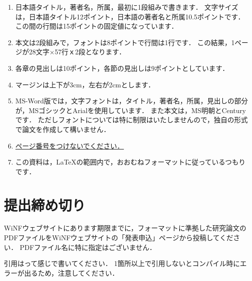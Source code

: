 \documentclass[a4j,8pt,twocolumn]{extarticle}
\begin{document}
\begin{enumerate}
\item 日本語タイトル，著者名，所属，最初に1段組みで書きます．
文字サイズは，日本語タイトル12ポイント，日本語の著者名と所属10.5ポイントです．
この間の行間は15ポイントの固定値になっています．

\item 本文は2段組みで，フォントは8ポイントで行間は1行です．
この結果，1ページが28文字×57行ｘ2段となります．

\item 各章の見出しは10ポイント，各節の見出しは9ポイントとしています．

\item マージンは上下が3cm，左右が2cmとします．

\item MS-Word版では，文字フォントは，タイトル，著者名，所属，見出しの部分が，MSゴシックとArialを使用しています．
また本文は，MS明朝とCenturyです．
ただしフォントについては特に制限はいたしませんので，独自の形式で論文を作成して構いません．

\item \underline{ページ番号をつけないでください．}

\item この資料は，\LaTeX の範囲内で，おおむねフォーマットに従っているつもりです．
\end{enumerate}


\section{提出締め切り}

WiNFウェブサイトにあります期限までに，フォーマットに準拠した研究論文のPDFファイルをWiNFウェブサイトの「発表申込」ページから投稿してください．
PDFファイル名に特に指定はございません．

引用は\cite{HKS:2010}って感じで書いてください．
1箇所以上で引用しないとコンパイル時にエラーが出るため，注意してください．


\end{document}
